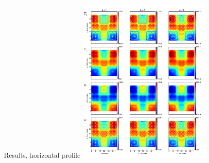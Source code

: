 \begin{frame}{Results, horizontal profile}
    \includegraphics[width=0.5\textwidth]{examples/map_anton_k.pdf}
\end{frame}

